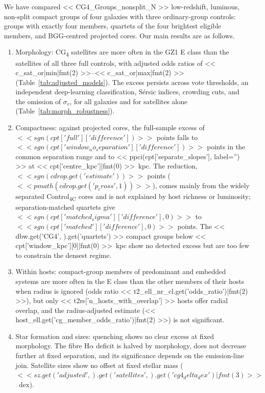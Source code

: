 \documentclass{aa}
\newcommand{\CC}{Control\textsubscript{4C}}
\newcommand{\CG}{CG\textsubscript{4}}
\begin{document}
We have compared << CG4_Groups_nonsplit_N >> low-redshift, luminous, non-split compact groups of four galaxies with three ordinary-group controls: groups with exactly four members, quartets of the four brightest eligible members, and BGG-centred projected cores. Our main results are as follows.
\begin{enumerate}
\item Morphology: \CG{} satellites are more often in the GZ1 E class than the satellites of all three full controls, with adjusted odds ratios of << c_sat_or|min|fmt(2) >>--<< c_sat_or|max|fmt(2) >> (Table~\ref{tab:adjusted_models}). The excess persists across vote thresholds, an independent deep-learning classification, S\'ersic indices, crowding cuts, and the omission of \(\sigma_v\), for all galaxies and for satellites alone (Table~\ref{tab:morph_robustness}).
\item Compactness: against projected cores, the full-sample excess of \(<< sgn(cpt['full']['difference']) >>\) points falls to \(<< sgn(cpt['window_no_separation']['difference']) >>\) points in the common separation range and to << ppci(cpt['separate_slopes'], label='') >> at << cpt['centre_kpc']|fmt(0) >>~kpc. The reduction, \(<< sgn(cdrop.get('estimate')) >>\) points (\(<< pmath(cdrop.get('p_cross', 1)) >>\)), comes mainly from the widely separated \CC{} cores and is not explained by host richness or luminosity; separation-matched quartets give \(<< sgn(cpt['matched_sigma']['difference'], 0) >>\) to \(<< sgn(cpt['matched']['difference'], 0) >>\) points. The << dbw.get('CG4', {}).get('quartets') >> compact groups below << cpt['window_kpc'][0]|fmt(0) >>~kpc show no detected excess but are too few to constrain the densest regime.
\item Within hosts: compact-group members of predominant and embedded systems are more often in the E class than the other members of their hosts when radius is ignored (odds ratio << t2_ell_nr_cl.get('odds_ratio')|fmt(2) >>), but only << t2rs['n_hosts_with_overlap'] >> hosts offer radial overlap, and the radius-adjusted estimate (<< host_ell.get('cg_member_odds_ratio')|fmt(2) >>) is not significant.
\item Star formation and sizes: quenching shows no clear excess at fixed morphology. The fibre H\(\alpha\) deficit is halved by morphology, does not decrease further at fixed separation, and its significance depends on the emission-line join. Satellite sizes show no offset at fixed stellar mass (\(<< sz.get('adjusted', {}).get('satellites', {}).get('cg4_delta_dex')|fmt(3) >>\)~dex).
\end{enumerate}
\end{document}
